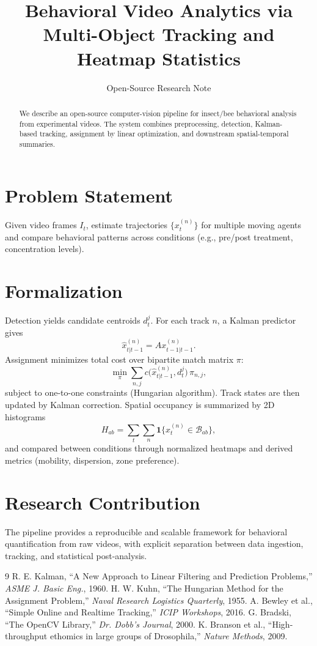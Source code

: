 ﻿\documentclass[11pt,a4paper]{article}
\title{Behavioral Video Analytics via Multi-Object Tracking and Heatmap Statistics}
\author{Open-Source Research Note}
\date{}
\begin{document}
\maketitle

\begin{abstract}
We describe an open-source computer-vision pipeline for insect/bee behavioral analysis from experimental videos. The system combines preprocessing, detection, Kalman-based tracking, assignment by linear optimization, and downstream spatial-temporal summaries.
\end{abstract}

\section{Problem Statement}
Given video frames $I_t$, estimate trajectories $\{x_t^{(n)}\}$ for multiple moving agents and compare behavioral patterns across conditions (e.g., pre/post treatment, concentration levels).

\section{Formalization}
Detection yields candidate centroids $d_t^j$. For each track $n$, a Kalman predictor gives
\[
\hat{x}_{t|t-1}^{(n)}=A x_{t-1|t-1}^{(n)}.
\]
Assignment minimizes total cost over bipartite match matrix $\pi$:
\[
\min_{\pi}\sum_{n,j} c\big(\hat{x}_{t|t-1}^{(n)},d_t^j\big)\,\pi_{n,j},
\]
subject to one-to-one constraints (Hungarian algorithm). Track states are then updated by Kalman correction. Spatial occupancy is summarized by 2D histograms
\[
H_{ab}=\sum_t\sum_n \mathbf{1}\{x_t^{(n)}\in \mathcal{B}_{ab}\},
\]
and compared between conditions through normalized heatmaps and derived metrics (mobility, dispersion, zone preference).

\section{Research Contribution}
The pipeline provides a reproducible and scalable framework for behavioral quantification from raw videos, with explicit separation between data ingestion, tracking, and statistical post-analysis.

\begin{thebibliography}{9}
 R. E. Kalman, ``A New Approach to Linear Filtering and Prediction Problems,'' \emph{ASME J. Basic Eng.}, 1960.
 H. W. Kuhn, ``The Hungarian Method for the Assignment Problem,'' \emph{Naval Research Logistics Quarterly}, 1955.
 A. Bewley et al., ``Simple Online and Realtime Tracking,'' \emph{ICIP Workshops}, 2016.
 G. Bradski, ``The OpenCV Library,'' \emph{Dr. Dobb's Journal}, 2000.
 K. Branson et al., ``High-throughput ethomics in large groups of Drosophila,'' \emph{Nature Methods}, 2009.
\end{thebibliography}
\end{document}
